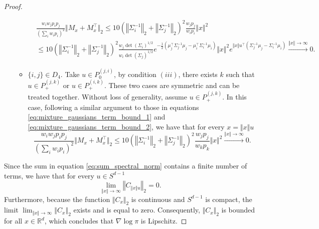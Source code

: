 \begin{proof}
\begin{enumerate}
\begin{itemize}
\small
\begin{align*}
    &\frac{ w_iw_j p_i p_j }{(\sum_i w_i p_i)^2}\Vert M_x + M_x^{\intercal} \Vert_2 \leq 10 \left(\left\Vert\Sigma_i^{-1}\right\Vert_2+ \left\Vert\Sigma_j^{-1}\right\Vert_2\right)^2 \frac{w_j p_j }{w_i p_i}\Vert x \Vert^2\\
    &\leq 10 \left(\left\Vert\Sigma_i^{-1}\right\Vert_2+ \left\Vert\Sigma_j^{-1}\right\Vert_2\right)^2 \frac{w_j \det(\Sigma_i)^{1/2}}{w_i \det(\Sigma_j)^{1/2}}  e^{-\frac{1}{2}\left(\mu_j^\intercal \Sigma_j^{-1} \mu_j-\mu_i^\intercal \Sigma_i^{-1} \mu_i\right)} \Vert x\Vert^2 e^{\Vert x\Vert u^{\intercal}\left(\Sigma_j^{-1}\mu_j-\Sigma_i^{-1}\mu_i\right)}  \xrightarrow{\Vert x\Vert \to \infty} 0.
\end{align*}
\normalsize



    
    \item $\{i, j\} \in D_4$. Take $u\in P_{0}^{(j, i)}$, by condition $(iii)$, there exists $k$ such that $u\in P_{+}^{(j, k)}$ or $u\in P_{+}^{(i, k)}$. These two cases are symmetric and can be treated together. Without loss of generality, assume $u\in P_{+}^{(j, k)}$. In this case, following a similar argument to those in equations \eqref{eq:mixture_gaussians_term_bound_1} and \eqref{eq:mixture_gaussians_term_bound_2}, we have that for every $x = \Vert x\Vert u$
\begin{equation*}
    \frac{ w_iw_j p_i p_j }{(\sum_i w_i p_i)^2}\Vert M_x + M_x^{\intercal} \Vert_2 \leq 10 \left(\left\Vert\Sigma_i^{-1}\right\Vert_2+ \left\Vert\Sigma_j^{-1}\right\Vert_2\right)^2 \frac{w_j p_j }{w_k p_k}\Vert x \Vert^2 \xrightarrow{\Vert x\Vert \to \infty} 0.
\end{equation*}
\end{itemize}
\end{enumerate} 
Since the sum in equation \eqref{eq:sum_spectral_norm} contains a finite number of terms, we have that for every $u\in S^{d-1}$
\begin{equation*}
    \lim_{\Vert x\Vert\to\infty}\left\Vert C_{\Vert x\Vert u}\right\Vert_2  = 0.
\end{equation*}
Furthermore, because the function $\Vert C_x\Vert_2$ is continuous and $S^{d-1}$ is compact, the limit $\lim_{\Vert x\Vert\to\infty}\left\Vert C_{x}\right\Vert_2$ exists and is equal to zero.
Consequently, $\Vert C_x\Vert_2$ is bounded for all $x\in\mathbb{R}^d$, which concludes that $\nabla\log\pi$ is Lipschitz.


\end{proof}
